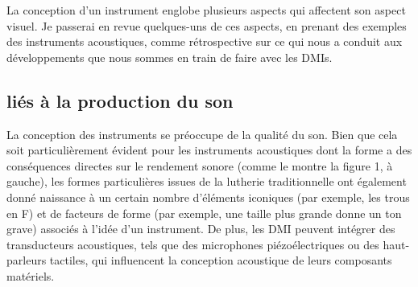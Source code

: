 La conception d'un instrument englobe plusieurs aspects qui affectent son aspect visuel. Je passerai en revue quelques-uns de ces aspects, en prenant des exemples des instruments acoustiques, comme rétrospective sur ce qui nous a conduit aux développements que nous sommes en train de faire avec les \glspl{DMI}.

\subsection{liés à la production du son}

La conception des instruments se préoccupe de la qualité du son. Bien que cela soit particulièrement évident pour les instruments acoustiques dont la forme a des conséquences directes sur le rendement sonore (comme le montre la figure 1, à gauche), les formes particulières issues de la lutherie traditionnelle ont également donné naissance à un certain nombre d'éléments iconiques (par exemple, les trous en F) et de facteurs de forme (par exemple, une taille plus grande donne un ton grave) associés à l'idée d'un instrument. De plus, les DMI peuvent intégrer des transducteurs acoustiques, tels que des microphones piézoélectriques ou des haut-parleurs tactiles, qui influencent la conception acoustique de leurs composants matériels.

